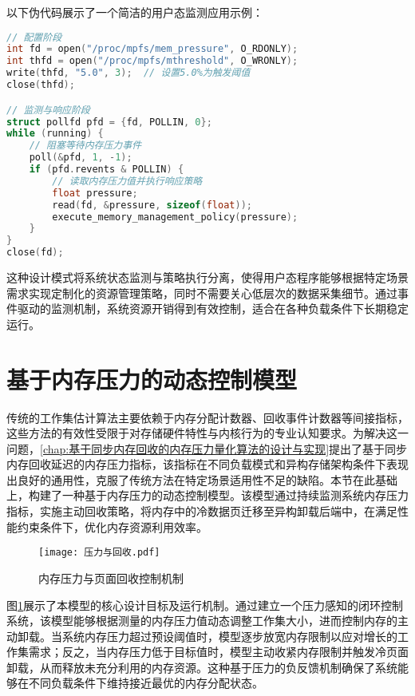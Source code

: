 以下伪代码展示了一个简洁的用户态监测应用示例：

\begin{lstlisting}[language=C]
// 配置阶段
int fd = open("/proc/mpfs/mem_pressure", O_RDONLY);
int thfd = open("/proc/mpfs/mthreshold", O_WRONLY);
write(thfd, "5.0", 3);  // 设置5.0%为触发阈值
close(thfd);

// 监测与响应阶段
struct pollfd pfd = {fd, POLLIN, 0};
while (running) {
    // 阻塞等待内存压力事件
    poll(&pfd, 1, -1);
    if (pfd.revents & POLLIN) {
        // 读取内存压力值并执行响应策略
        float pressure;
        read(fd, &pressure, sizeof(float));
        execute_memory_management_policy(pressure);
    }
}
close(fd);
\end{lstlisting}

这种设计模式将系统状态监测与策略执行分离，使得用户态程序能够根据特定场景需求实现定制化的资源管理策略，同时不需要关心低层次的数据采集细节。通过事件驱动的监测机制，系统资源开销得到有效控制，适合在各种负载条件下长期稳定运行。

\section{基于内存压力的动态控制模型}
\label{sec:pressure_based_model}

传统的工作集估计算法主要依赖于内存分配计数器、回收事件计数器等间接指标，这些方法的有效性受限于对存储硬件特性与内核行为的专业认知要求。为解决这一问题，\ref{chap:基于同步内存回收的内存压力量化算法的设计与实现}提出了基于同步内存回收延迟的内存压力指标，该指标在不同负载模式和异构存储架构条件下表现出良好的通用性，克服了传统方法在特定场景适用性不足的缺陷。本节在此基础上，构建了一种基于内存压力的动态控制模型。该模型通过持续监测系统内存压力指标，实施主动回收策略，将内存中的冷数据页迁移至异构卸载后端中，在满足性能约束条件下，优化内存资源利用效率。

\begin{figure}[h]
\centering
\texttt{[image: 压力与回收.pdf]}
\caption{内存压力与页面回收控制机制}
\label{fig:pressure_work_set}
\end{figure}

图\ref{fig:pressure_work_set}展示了本模型的核心设计目标及运行机制。通过建立一个压力感知的闭环控制系统，该模型能够根据测量的内存压力值动态调整工作集大小，进而控制内存的主动卸载。当系统内存压力超过预设阈值时，模型逐步放宽内存限制以应对增长的工作集需求；反之，当内存压力低于目标值时，模型主动收紧内存限制并触发冷页面卸载，从而释放未充分利用的内存资源。这种基于压力的负反馈机制确保了系统能够在不同负载条件下维持接近最优的内存分配状态。

